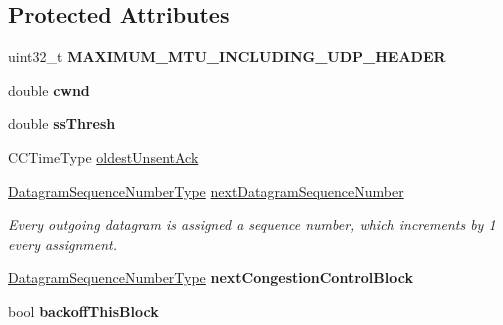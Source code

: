 \subsection*{Protected Attributes}
\begin{DoxyCompactItemize}
\item 
\hypertarget{class_rak_net_1_1_c_c_rak_net_sliding_window_a39da7f232c120c98916b0f673ce8e0da}{uint32\-\_\-t {\bfseries M\-A\-X\-I\-M\-U\-M\-\_\-\-M\-T\-U\-\_\-\-I\-N\-C\-L\-U\-D\-I\-N\-G\-\_\-\-U\-D\-P\-\_\-\-H\-E\-A\-D\-E\-R}}\label{class_rak_net_1_1_c_c_rak_net_sliding_window_a39da7f232c120c98916b0f673ce8e0da}

\item 
\hypertarget{class_rak_net_1_1_c_c_rak_net_sliding_window_a5247591e49e3533b68b144bd425edea1}{double {\bfseries cwnd}}\label{class_rak_net_1_1_c_c_rak_net_sliding_window_a5247591e49e3533b68b144bd425edea1}

\item 
\hypertarget{class_rak_net_1_1_c_c_rak_net_sliding_window_a0cbd46624da2268aee34253b6e4d5a3c}{double {\bfseries ss\-Thresh}}\label{class_rak_net_1_1_c_c_rak_net_sliding_window_a0cbd46624da2268aee34253b6e4d5a3c}

\item 
C\-C\-Time\-Type \hyperlink{class_rak_net_1_1_c_c_rak_net_sliding_window_addc3099db5884a308893f31429a6be28}{oldest\-Unsent\-Ack}
\item 
\hypertarget{class_rak_net_1_1_c_c_rak_net_sliding_window_a10fd5e4866fd0a7231147dae09fd163f}{\hyperlink{struct_rak_net_1_1uint24__t}{Datagram\-Sequence\-Number\-Type} \hyperlink{class_rak_net_1_1_c_c_rak_net_sliding_window_a10fd5e4866fd0a7231147dae09fd163f}{next\-Datagram\-Sequence\-Number}}\label{class_rak_net_1_1_c_c_rak_net_sliding_window_a10fd5e4866fd0a7231147dae09fd163f}

\begin{DoxyCompactList}\small\item\em Every outgoing datagram is assigned a sequence number, which increments by 1 every assignment. \end{DoxyCompactList}\item 
\hypertarget{class_rak_net_1_1_c_c_rak_net_sliding_window_a31ca53ddbec44b4178b48b4f84898971}{\hyperlink{struct_rak_net_1_1uint24__t}{Datagram\-Sequence\-Number\-Type} {\bfseries next\-Congestion\-Control\-Block}}\label{class_rak_net_1_1_c_c_rak_net_sliding_window_a31ca53ddbec44b4178b48b4f84898971}

\item 
\hypertarget{class_rak_net_1_1_c_c_rak_net_sliding_window_a0562bf748c7e41977c4f20e4d48fc04c}{bool {\bfseries backoff\-This\-Block}}\label{class_rak_net_1_1_c_c_rak_net_sliding_window_a0562bf748c7e41977c4f20e4d48fc04c}


\end{DoxyCompactItemize}

